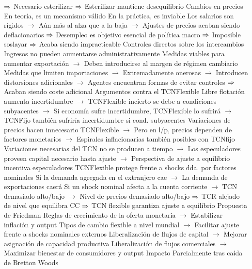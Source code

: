 \documentclass{nuevotema}
\begin{document}
\begin{esquemal}
				\4[] $\Rightarrow$ Necesario esterilizar
				\4[] $\Rightarrow$ Esterilizar mantiene desequilibrio
				\4 Cambios en precios
				\4[] En teoría, es un mecanismo válido
				\4[] En la práctica, es inviable
				\4[] Los salarios son rígidos
				\4[] $\to$ Aún más al alza que a la baja
				\4[] $\to$ Ajustes de precios acaban siendo deflacionarios
				\4[] $\Rightarrow$ Desempleo es objetivo esencial de política macro
				\4[] $\Rightarrow$ Imposible soslayar
				\4[] $\Rightarrow$ Acaba siendo impracticable
				\4 Controles directos sobre los intercambios
				\4[] Ingresos no pueden aumentarse administrativamente
				\4[] Medidas viables para aumentar exportación
				\4[] $\to$ Deben introducirse al margen de régimen cambiario
				\4[] Medidas que limiten importaciones
				\4[] $\to$ Extremadamente onerosas
				\4[] $\to$ Introducen distorsiones adicionales
				\4[] $\to$ Agentes encuentran formas de evitar controles
				\4[] $\Rightarrow$ Acaban siendo coste adicional
				\4 Argumentos contra el TCNFlexible
				\4[] Libre flotación aumenta incertidumbre
				\4[] $\to$ TCNFlexible incierto se debe a condiciones subyacentes
				\4[] $\to$ Si economía sufre incertidumbre, TCNFlexible lo sufrirá
				\4[] $\to$ TCNFijo también sufriría incertidumbre si cond. subyacentes
				\4[] Variaciones de precios hacen innecesario TCNFlexible
				\4[] $\to$ Pero en l/p, precios dependen de factores monetarios
				\4[] $\to$ Espirales inflacionarias también posibles con TCNfijo
				\4[] Variaciones necesarias del TCN no se producen a tiempo
				\4[] $\to$ Los especuladores proveen capital necesario hasta ajuste
				\4[] $\to$ Perspectiva de ajuste a equilibrio incentiva especuladores
				\4 TCNFlexible protege frente a shocks dda. por factores nominales
				\4[] Si la demanda agregada en el extranjero cae
				\4[] $\to$ La demanda de exportaciones caerá
				\4[] Si un shock nominal afecta a la cuenta corriente
				\4[] $\to$ TCN demasiado alto/bajo
				\4[] $\to$ Nivel de precios demasiado alto/bajo
				\4[] $\Rightarrow$ TCR alejado de nivel que equilibra CC
				\4[] $\Rightarrow$ TCN flexible garantiza ajuste a equilibrio
				\4 Propuesta de Friedman
				\4[] Reglas de crecimiento de la oferta monetaria
				\4[] $\to$ Estabilizar inflación y output
				\4[] Tipos de cambio flexible a nivel mundial
				\4[] $\to$ Facilitar ajuste frente a shocks nominales externos
				\4[] Liberalización de flujos de capital
				\4[] $\to$ Mejorar asignación de capacidad productiva
				\4[] Liberalización de flujos comerciales
				\4[] $\to$ Maximizar bienestar de consumidores y output
				\4 Impacto
				\4[] Parcialmente tras caída de Bretton Woods

\end{esquemal}
\end{document}

